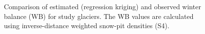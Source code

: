 \documentclass[onecolumn, letterpaper]{igs}
\begin{document}
\begin{figure}
	\caption[Comparison of estimated (regression kriging) and observed winter balance (WB) for study glaciers]{Comparison of estimated (regression kriging) and observed winter balance (WB) for study glaciers. The WB values are calculated using inverse-distance weighted snow-pit densities (S4).}
	\label{fig:R2regressionkrig}
\end{figure}




\clearpage
%



\end{document}
